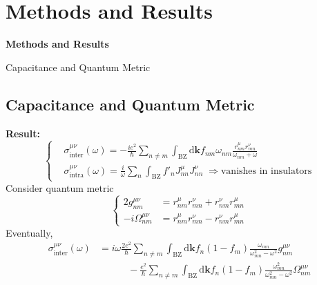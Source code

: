 \documentclass[professionalfont]{beamer}
\newcommand{\mrm}[1]{\mathrm{#1}}
\newcommand{\bo}[1]{\mathbf{#1}}
\begin{document}
{
\section{Methods and Results}
\begin{frame}
    \centering
    \huge
    \textbf{Methods and Results}
\end{frame}
}
\begin{frame}{Capacitance and Quantum Metric}
\subsection{Capacitance and Quantum Metric}

{\footnotesize
    {\Large\textbf{Result:}}
    \[
    \left\{
    \begin{aligned}
    & \sigma^{\mu\nu}_{\mrm{inter}}(\omega) = -\frac{ie^2}{\hbar}\sum_{n\neq m}\int_{\mrm{BZ}}\mrm{d}\bo{k}f_{nm}\omega_{nm}\frac{r^\mu_{nm}r^\nu_{mn}}{\omega_{nm} + \omega} \\
    & \sigma^{\mu\nu}_{\mrm{intra}}(\omega) = \frac{i}{\omega}\sum_n\int_{\mrm{BZ}}f'_nJ^\mu_{nn}J^\nu_{nn}\; \Longrightarrow\text{vanishes in insulators}
    \end{aligned}
    \right.
    \]
    Consider quantum metric
    \[
    \left\{
    \begin{aligned}
    2g^{\mu\nu}_{nm} &= r^\mu_{nm}r^\nu_{mn} + r^\nu_{nm}r^\mu_{mn} \\
     -i\Omega^{\mu\nu}_{nm} &= r^\mu_{nm}r^\nu_{mn} - r^\nu_{nm}r^\mu_{mn}
    \end{aligned}
    \right.
    \]
    Eventually,
    \begin{align*}
        \sigma^{\mu\nu}_{\mrm{inter}}(\omega) &= i\omega\frac{2e^2}{\hbar}\sum_{n\neq m}\int_{\mrm{BZ}}\mrm{d}\bo{k}f_n(1-f_m)\frac{\omega_{mn}}{\omega_{mn}^2-\omega^2}g^{\mu\nu}_{nm}\\
        &\quad\quad\quad -\frac{e^2}{\hbar}\sum_{n\neq m}\int_{\mrm{BZ}}\mrm{d}\bo{k}f_n(1-f_m)\frac{\omega_{mn}^2}{\omega_{mn}^2-\omega^2}\Omega^{\mu\nu}_{nm}
    \end{align*}
  }  
\end{frame}
\end{document}
